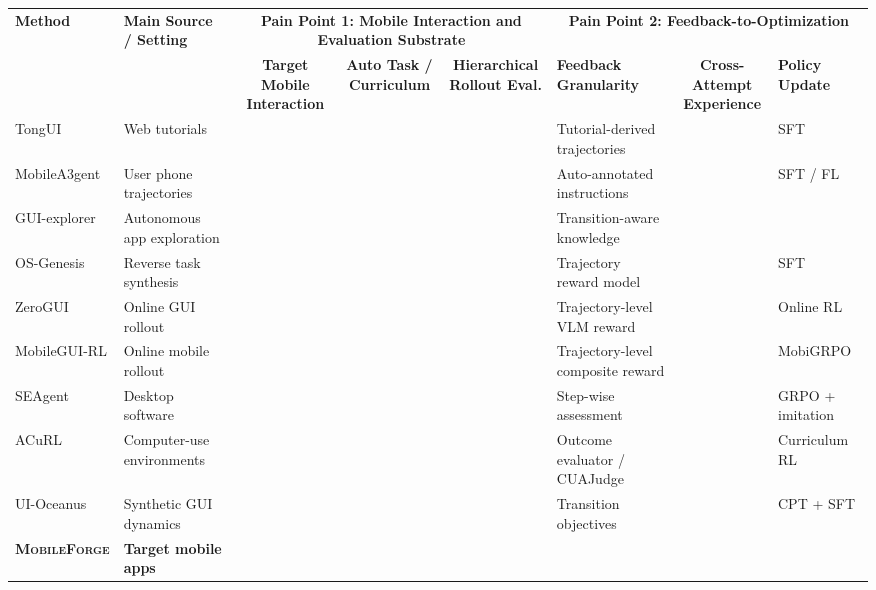 \documentclass{llmxive}
\providecommand{\cmark}{\ding{51}}
\providecommand{\xmark}{\ding{55}}
\providecommand{\pmark}{\raisebox{0.1ex}{\scriptsize$\triangle$}}
\providecommand{\ourmethod}{\textsc{MobileForge}\xspace}
\providecommand{\paperCompactTable}{  \footnotesize
  \setlength{\tabcolsep}{3.8pt}  \renewcommand{\arraystretch}{1.10}}
\begin{document}
\begin{table}[t]
\centering
\paperCompactTable
\begin{paperFit}[\textwidth]
\begin{tabular}{l l c c c l c l}
\toprule
\textbf{Method} &
\textbf{Main Source / Setting} &
\multicolumn{3}{c}{\textbf{Pain Point 1: Mobile Interaction and Evaluation Substrate}} &
\multicolumn{3}{c}{\textbf{Pain Point 2: Feedback-to-Optimization}} \\
\cmidrule(lr){3-5} \cmidrule(lr){6-8}
&
&
\makecell{\textbf{Target Mobile}\\\textbf{Interaction}} &
\makecell{\textbf{Auto Task /}\\\textbf{Curriculum}} &
\makecell{\textbf{Hierarchical}\\\textbf{Rollout Eval.}} &
\makecell{\textbf{Feedback}\\\textbf{Granularity}} &
\makecell{\textbf{Cross-Attempt}\\\textbf{Experience}} &
\makecell{\textbf{Policy}\\\textbf{Update}} \\
\midrule
TongUI & Web tutorials & \pmark & \xmark & \xmark & Tutorial-derived trajectories & \xmark & SFT \\
MobileA3gent & User phone trajectories & \pmark & \xmark & \xmark & Auto-annotated instructions & \xmark & SFT / FL \\
GUI-explorer & Autonomous app exploration & \cmark & \pmark & \xmark & Transition-aware knowledge & \pmark & \xmark \\
OS-Genesis & Reverse task synthesis & \pmark & \cmark & \pmark & Trajectory reward model & \xmark & SFT \\
ZeroGUI & Online GUI rollout & \pmark & \cmark & \pmark & Trajectory-level VLM reward & \xmark & Online RL \\
MobileGUI-RL & Online mobile rollout & \cmark & \cmark & \pmark & Trajectory-level composite reward & \xmark & MobiGRPO \\
SEAgent & Desktop software & \xmark & \cmark & \pmark & Step-wise assessment & \pmark & GRPO + imitation \\
ACuRL & Computer-use environments & \xmark & \cmark & \pmark & Outcome evaluator / CUAJudge & \pmark & Curriculum RL \\
UI-Oceanus & Synthetic GUI dynamics & \pmark & \cmark & \xmark & Transition objectives & \xmark & CPT + SFT \\
\midrule
\rowcolor{oursrowcolor}
\textbf{\ourmethod} &
\textbf{Target mobile apps} &

\end{tabular}
\end{paperFit}
\end{table}
\end{document}
